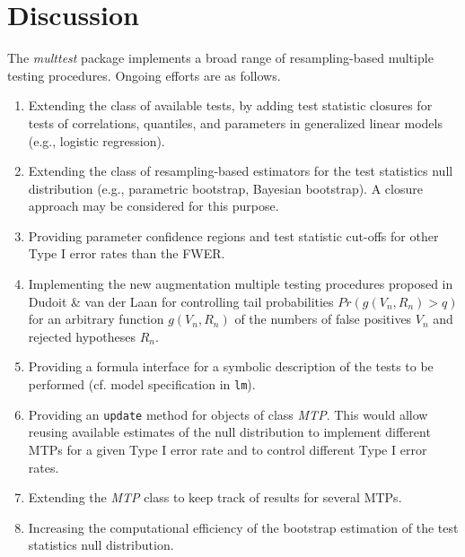 \documentclass[11pt]{article}
\newcommand{\Rpackage}[1]{\textit{#1}}
\newcommand{\Robject}[1]{\texttt{#1}}
\newcommand{\Rclass}[1]{\textit{#1}}
\begin{document}
\section{Discussion}
\label{anal:mult:s:disc}

The \Rpackage{multtest} package implements a broad range of resampling-based multiple testing procedures. Ongoing efforts are as follows.
\begin{enumerate}
\item
Extending the class of available tests, by adding test statistic closures for tests of correlations, quantiles, and parameters in generalized linear models (e.g., logistic regression).
\item
Extending the class of resampling-based estimators for the test statistics null distribution (e.g., parametric bootstrap, Bayesian bootstrap). A closure approach may be considered for this purpose.
\item
Providing parameter confidence regions and test statistic cut-offs for other Type I error rates than the FWER.
\item
Implementing the new augmentation multiple testing procedures proposed in Dudoit \& van der Laan \cite{Dudoit&vdLaanMTBook} for controlling tail probabilities $Pr(g(V_n,R_n) > q)$ for an arbitrary function $g(V_n,R_n)$ of the numbers of false positives $V_n$ and rejected hypotheses $R_n$.
\item
Providing a formula interface for a symbolic description of the tests to be performed (cf. model specification in \Robject{lm}).
\item
Providing an \Robject{update} method for objects of class \Rclass{MTP}. 
This would allow reusing available estimates of the null distribution to implement different MTPs for a given Type I error rate and to control different Type I error rates. 
\item
Extending the \Rclass{MTP} class to keep track of results for several MTPs.
\item
Increasing the computational efficiency of the bootstrap estimation of the test statistics null distribution.
\end{enumerate}






\end{document}
